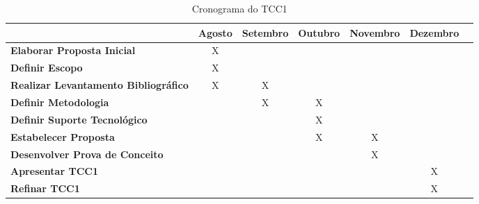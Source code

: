 \begin{table}[h]
\centering
\caption{Cronograma do TCC1}
\label{cronograma tcc1}
\begin{adjustbox}{width=\textwidth}
\begin{tabular}{|l|c|c|c|c|c|c|}
\hline
                                      			& \multicolumn{1}{l|}{\textbf{Agosto}} & \multicolumn{1}{l|}{\textbf{Setembro}} & \multicolumn{1}{l|}{\textbf{Outubro}} & \multicolumn{1}{l|}{\textbf{Novembro}} & \multicolumn{1}{l|}{\textbf{Dezembro}} \\ \hline
\textbf{Elaborar Proposta Inicial}              & X                           		   &                               			&                              			&                               		 &                               		  \\ \hline
\textbf{Definir Escopo}                         & X                           		   &                               			&                              			&                               		 &                               		  \\ \hline
\textbf{Realizar Levantamento Bibliográfico}    & X                           		   & X                             			&                              			&                               		 &                               		  \\ \hline
\textbf{Definir Metodologia} 					&                             		   & X                             			& X                            			&                               		 &                               		  \\ \hline
\textbf{Definir Suporte Tecnológico}            &                             		   &                               			& X                            			&                               		 &                               		  \\ \hline
\textbf{Estabelecer Proposta}                   &                             		   &                               			& X                            			& X                             		 &                               		  \\ \hline
\textbf{Desenvolver Prova de Conceito}          &                             		   &                               			&                              			& X                             		 &                               		  \\ \hline
\textbf{Apresentar TCC1}                        &                             		   &                               			&                              			&			                              	   & X                             		  \\ \hline
\textbf{Refinar TCC1}                           &                             		   &                               			&                              			&                               		 & X                              		  \\ \hline
\end{tabular}
\end{adjustbox}
\end{table}

